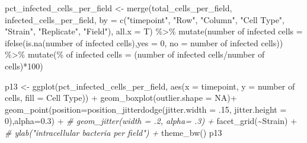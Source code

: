 \documentclass[
]{article}
\newenvironment{Shaded}{\begin{snugshade}}{\end{snugshade}}
\newcommand{\AttributeTok}[1]{\textcolor[rgb]{0.77,0.63,0.00}{#1}}
\newcommand{\CommentTok}[1]{\textcolor[rgb]{0.56,0.35,0.01}{\textit{#1}}}
\newcommand{\ConstantTok}[1]{\textcolor[rgb]{0.00,0.00,0.00}{#1}}
\newcommand{\DecValTok}[1]{\textcolor[rgb]{0.00,0.00,0.81}{#1}}
\newcommand{\FloatTok}[1]{\textcolor[rgb]{0.00,0.00,0.81}{#1}}
\newcommand{\FunctionTok}[1]{\textcolor[rgb]{0.00,0.00,0.00}{#1}}
\newcommand{\NormalTok}[1]{#1}
\newcommand{\OtherTok}[1]{\textcolor[rgb]{0.56,0.35,0.01}{#1}}
\newcommand{\SpecialCharTok}[1]{\textcolor[rgb]{0.00,0.00,0.00}{#1}}
\newcommand{\StringTok}[1]{\textcolor[rgb]{0.31,0.60,0.02}{#1}}
\begin{document}
\begin{Shaded}
\begin{Highlighting}[]
\NormalTok{pct\_infected\_cells\_per\_field }\OtherTok{\textless{}{-}} \FunctionTok{merge}\NormalTok{(total\_cells\_per\_field, infected\_cells\_per\_field,}
                                      \AttributeTok{by =} \FunctionTok{c}\NormalTok{(}\StringTok{"timepoint"}\NormalTok{, }\StringTok{"Row"}\NormalTok{, }\StringTok{"Column"}\NormalTok{, }\StringTok{"Cell Type"}\NormalTok{, }\StringTok{"Strain"}\NormalTok{, }\StringTok{"Replicate"}\NormalTok{, }\StringTok{"Field"}\NormalTok{),}
                                      \AttributeTok{all.x =}\NormalTok{ T) }\SpecialCharTok{\%\textgreater{}\%}
  \FunctionTok{mutate}\NormalTok{(}\StringTok{\textasciigrave{}}\AttributeTok{number of infected cells}\StringTok{\textasciigrave{}} \OtherTok{=} \FunctionTok{ifelse}\NormalTok{(}\FunctionTok{is.na}\NormalTok{(}\StringTok{\textasciigrave{}}\AttributeTok{number of infected cells}\StringTok{\textasciigrave{}}\NormalTok{),}\AttributeTok{yes =} \DecValTok{0}\NormalTok{, }\AttributeTok{no =} \StringTok{\textasciigrave{}}\AttributeTok{number of infected cells}\StringTok{\textasciigrave{}}\NormalTok{)) }\SpecialCharTok{\%\textgreater{}\%}
  \FunctionTok{mutate}\NormalTok{(}\StringTok{\textasciigrave{}}\AttributeTok{\% of infected cells}\StringTok{\textasciigrave{}} \OtherTok{=}\NormalTok{ (}\StringTok{\textasciigrave{}}\AttributeTok{number of infected cells}\StringTok{\textasciigrave{}}\SpecialCharTok{/}\StringTok{\textasciigrave{}}\AttributeTok{number of cells}\StringTok{\textasciigrave{}}\NormalTok{)}\SpecialCharTok{*}\DecValTok{100}\NormalTok{)}


\NormalTok{p13 }\OtherTok{\textless{}{-}} \FunctionTok{ggplot}\NormalTok{(pct\_infected\_cells\_per\_field, }\FunctionTok{aes}\NormalTok{(}\AttributeTok{x =}\NormalTok{ timepoint, }\AttributeTok{y =} \StringTok{\textasciigrave{}}\AttributeTok{number of cells}\StringTok{\textasciigrave{}}\NormalTok{, }\AttributeTok{fill =} \StringTok{\textasciigrave{}}\AttributeTok{Cell Type}\StringTok{\textasciigrave{}}\NormalTok{)) }\SpecialCharTok{+}
  \FunctionTok{geom\_boxplot}\NormalTok{(}\AttributeTok{outlier.shape =} \ConstantTok{NA}\NormalTok{)}\SpecialCharTok{+}
  \FunctionTok{geom\_point}\NormalTok{(}\AttributeTok{position=}\FunctionTok{position\_jitterdodge}\NormalTok{(}\AttributeTok{jitter.width =}\NormalTok{ .}\DecValTok{15}\NormalTok{, }\AttributeTok{jitter.height =} \DecValTok{0}\NormalTok{),}\AttributeTok{alpha=}\FloatTok{0.3}\NormalTok{) }\SpecialCharTok{+}
  \CommentTok{\#  geom\_jitter(width = .2, alpha= .3) +}
  \FunctionTok{facet\_grid}\NormalTok{(}\SpecialCharTok{\textasciitilde{}}\NormalTok{Strain) }\SpecialCharTok{+}
  \CommentTok{\#  ylab("intracellular bacteria per field") +}
  \FunctionTok{theme\_bw}\NormalTok{()}
\NormalTok{p13}
\end{Highlighting}
\end{Shaded}
\end{document}
